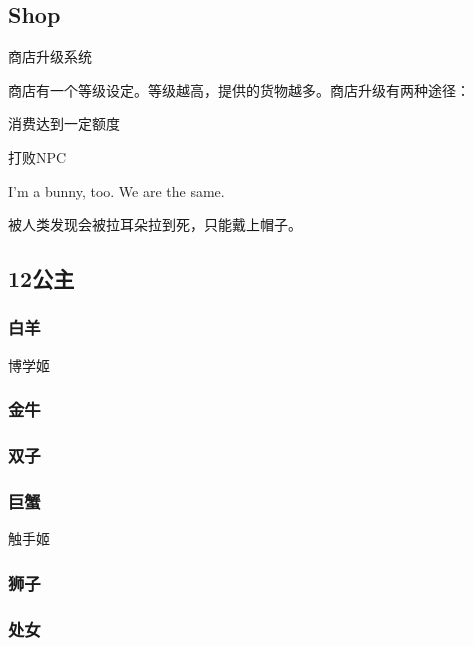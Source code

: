 \documentclass{article}
\begin{document}

\subsection{Shop}

商店升级系统

商店有一个等级设定。等级越高，提供的货物越多。商店升级有两种途径：

消费达到一定额度

打败NPC

I'm a bunny, too. We are the same.

被人类发现会被拉耳朵拉到死，只能戴上帽子。

\subsection{12公主}

\subsubsection{白羊}
\label{costume_majo}

博学姬

\subsubsection{金牛}
\label{costume_maid}



\subsubsection{双子}
\label{costume_idol}



\subsubsection{巨蟹}
\label{costume_mermaid}

触手姬

\subsubsection{狮子}
\label{costume_hime}


\subsubsection{处女}
\label{costume_dress}
\end{document}
